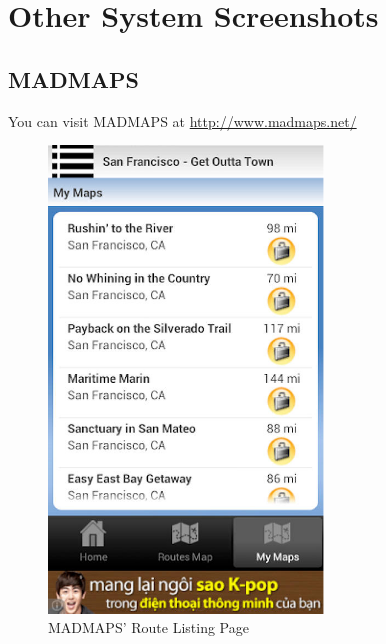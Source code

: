 \documentclass[a4paper,twoside,notitlepage,11pt]{article}
\begin{document}
\newpage 
\appendix
\section{Other System Screenshots} \label{app-othersystems}
\subsection{MADMAPS} 
You can visit MADMAPS at \url{http://www.madmaps.net/}
\begin{figure}[!ht]
	\centering
	\begin{minipage}{.49\textwidth}
		\begin{center}
			\includegraphics[width=0.65\textwidth]{images/mm-1.png}
			\caption{MADMAPS' Route Listing Page}
		\end{center}
	\end{minipage}
	\begin{minipage}{.49\textwidth}
		\begin{center}

\end{center}
\end{minipage}
\end{figure}
\end{document}
